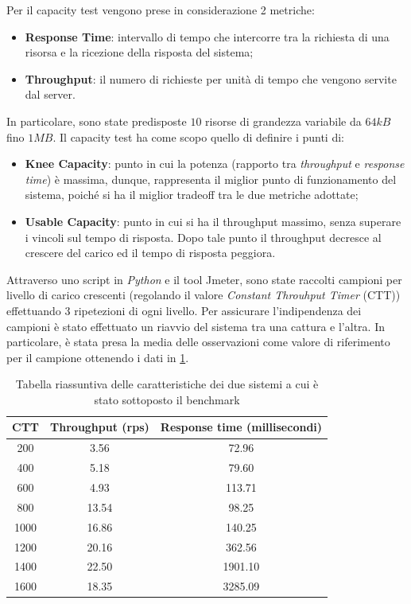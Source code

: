 Per il capacity test vengono prese in considerazione 2 metriche:
\begin{itemize}
    \item \textbf{Response Time}: intervallo di tempo che intercorre tra la richiesta
di una risorsa e la ricezione della risposta del sistema;
    \item \textbf{Throughput}: il numero di richieste per unità di tempo che
vengono servite dal server.
\end{itemize}

In particolare, sono state predisposte $10$ risorse di grandezza variabile da $64kB$ fino $1MB$.
Il capacity test ha come scopo quello di definire i punti di:
\begin{itemize}
    \item \textbf{Knee Capacity}: punto in cui la potenza (rapporto tra \textit{throughput}
    e \textit{response time}) è massima, dunque, rappresenta il miglior
    punto di funzionamento del sistema, poiché si ha il miglior tradeoff
    tra le due metriche adottate;
    \item \textbf{Usable Capacity}: punto in cui si ha il throughput massimo,
    senza superare i vincoli sul tempo di risposta. Dopo tale punto il
    throughput decresce al crescere del carico ed il tempo di risposta
    peggiora.
\end{itemize}
Attraverso uno script in \textit{Python} e il tool Jmeter, sono state raccolti campioni per livello di carico crescenti (regolando il valore \textit{Constant Throuhput Timer} (CTT)) effettuando 3 ripetezioni di ogni livello. 
Per assicurare l'indipendenza dei campioni è stato effettuato un riavvio del sistema tra una cattura e l'altra.
In particolare, è stata presa la media delle osservazioni come valore di riferimento per il campione ottenendo i dati in \cref{tab:capacity_results}. 
\begin{table}[H]

\centering
    \begin{tabular}{|c|c|c|}
    \hline
    \multicolumn{1}{|c|}{\textbf{CTT}} &
    \multicolumn{1}{|c|}{\textbf{Throughput (rps)}} &
    \multicolumn{1}{c|}{\textbf{Response time (millisecondi)}}  \tabularnewline \hline

200 & 3.56 & 72.96 \tabularnewline \hline
400 & 5.18 & 79.60 \tabularnewline \hline
600 & 4.93 & 113.71 \tabularnewline \hline
800 & 13.54 & 98.25 \tabularnewline \hline
1000 & 16.86 & 140.25 \tabularnewline \hline
1200 & 20.16 & 362.56 \tabularnewline \hline
1400 & 22.50 & 1901.10 \tabularnewline \hline
1600 & 18.35 & 3285.09 \tabularnewline \hline
\end{tabular}
\caption{Tabella riassuntiva delle caratteristiche dei due sistemi a cui è stato sottoposto il benchmark}
\label{tab:capacity_results}
\end{table}


